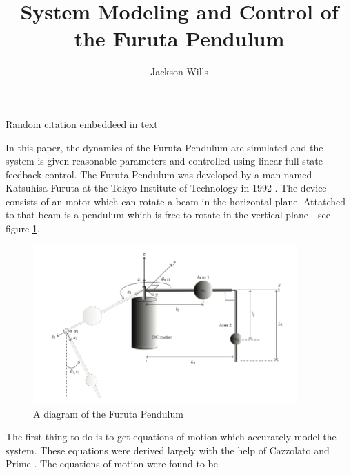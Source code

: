 \documentclass[letterpaper,10pt,oneside]{article}
\title{System Modeling and Control of the Furuta Pendulum}
\author{Jackson Wills}
\begin{document}
\maketitle

\tableofcontents

Random citation \cite{SWINGUP} embeddeed in \citet{SWINGUP} text \cite{DYNAMICS}

In this paper, \citep{SWINGUP} the dynamics of the Furuta Pendulum are simulated and the system is given reasonable parameters and controlled using linear full-state feedback control. The Furuta Pendulum was developed by a man named Katsuhisa Furuta at the Tokyo Institute of Technology in 1992 \cite{DYNAMICS}. The device consists of an motor which can rotate a beam in the horizontal plane. Attatched to that beam is a pendulum which is free to rotate in the vertical plane - see figure \ref{fig:diagram}.


\begin{figure}
  \centering
  \includegraphics[width=0.9\textwidth]{FurutaDiagram}
  \caption{A diagram of the Furuta Pendulum \cite{DYNAMICS}}
  \label{fig:diagram}
\end{figure}


The first thing to do is to get equations of motion which accurately model the system. These equations were derived largely with the help of Cazzolato and Prime \cite{DYNAMICS}. The equations of motion were found to be \\
\end{document}
